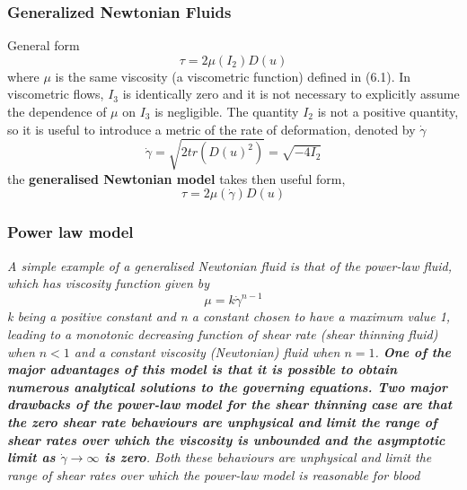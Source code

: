 \documentclass[11pt,letterpaper]{article}
\begin{document}
\subsubsection*{Generalized Newtonian Fluids}
General form 
\begin{equation}
    \tau = 2 \mu(I_2) D(u)
\end{equation}
where $\mu$ is the same viscosity (a viscometric function) defined in (6.1). In viscometric flows, $I_3$ is identically zero and it is not necessary to explicitly assume the dependence of  $\mu$  on  $I_3$ is negligible. The quantity  $I_2$ is not a positive quantity, so it is useful to introduce a metric of the rate of deformation, denoted by $\Dot{\gamma} $
\begin{equation}
    \Dot{\gamma} = \sqrt{2 tr(D(u)^2)} = \sqrt{-4I_2} 
\end{equation}
the \textbf{generalised Newtonian model} takes then useful form, 
\begin{equation}
    \tau = 2 \mu(  \Dot{\gamma}) D(u)
\end{equation}

\subsubsection*{Power law model}\textit{A simple example of a generalised Newtonian fluid is that of the power-law fluid, which has viscosity function given by
\begin{equation}
    \mu = k \Dot{\gamma}^{n-1}
\end{equation}
k being a positive constant and n a constant chosen to have a maximum value 1, leading to a monotonic decreasing function of shear rate (shear thinning fluid) when $n< 1$ and a constant viscosity (Newtonian) fluid when $n =1$. \textbf{One of the major advantages of this model is that it is possible to obtain numerous analytical solutions to the governing equations. Two major drawbacks of the power-law model for the shear thinning case are that the zero shear rate behaviours are unphysical and limit the range of shear rates over which the viscosity is unbounded and the asymptotic limit as $\Dot{\gamma}\longrightarrow \infty$ is zero}. {\color{red}Both these behaviours are unphysical and limit the range of shear rates over which the power-law model is reasonable for blood}
}
\end{document}
